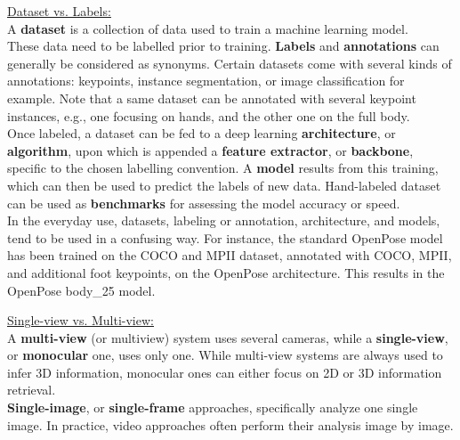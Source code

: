 \noindent\underline{Dataset vs. Labels: }\\
A \textbf{dataset} is a collection of data used to train a machine learning model. \\
These data need to be labelled prior to training. \textbf{Labels} and \textbf{annotations} can generally be considered as synonyms. Certain datasets come with several kinds of annotations: keypoints, instance segmentation, or image classification for example. Note that a same dataset can be annotated with several keypoint instances, e.g., one focusing on hands, and the other one on the full body.\\
Once labeled, a dataset can be fed to a deep learning \textbf{architecture}, or \textbf{algorithm}, upon which is appended a \textbf{feature extractor}, or \textbf{backbone}, specific to the chosen labelling convention. A \textbf{model} results from this training, which can then be used to predict the labels of new data. Hand-labeled dataset can be used as \textbf{benchmarks} for assessing the model accuracy or speed. \\
In the everyday use, datasets, labeling or annotation, architecture, and models, tend to be used in a confusing way. For instance, the standard OpenPose model has been trained on the COCO and MPII dataset, annotated with COCO, MPII, and additional foot keypoints, on the OpenPose architecture. This results in the OpenPose body\_25 model. 

\vspace*{0.5cm}

\noindent\underline{Single-view vs. Multi-view:}\\
A \textbf{multi-view} (or multiview) system uses several cameras, while a \textbf{single-view}, or \textbf{monocular} one, uses only one. While multi-view systems are always used to infer 3D information, monocular ones can either focus on 2D or 3D information retrieval.\\
\textbf{Single-image}, or \textbf{single-frame} approaches, specifically analyze one single image. In practice, video approaches often perform their analysis image by image.\\

\vspace*{0.5cm}

